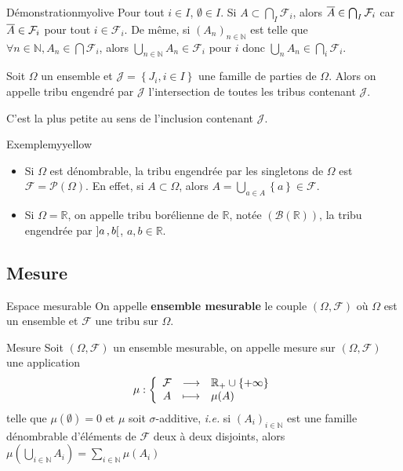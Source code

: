     \begin{demo}{Démonstration}{myolive}
        Pour tout $i \in I$, $\emptyset \in I$. Si $A \subset \bigcap_{I} \mathcal{F}_i$, alors $\overline{A} \in \bigcap_{I} \mathcal{F}_i$ car $\overline{A} \in \mathcal{F}_i$ pour tout $i \in \mathcal{F}_i$. De même, si $(A_n)_{n \in \mathbb{N}}$ est telle que $\forall n \in \mathbb{N}, A_n \in \bigcap \mathcal{F}_i$, alors $\bigcup_{n \in \mathbb{N}} A_n \in \mathcal{F}_i$ pour $i$ donc $\bigcup_n A_n \in \bigcap_i \mathcal{F}_i$.
    \end{demo}

    \begin{defi}{}{}
        Soit $\Omega$ un ensemble et $\mathcal{J} = \left\{J_i, i \in I\right\}$ une famille de parties de $\Omega$. Alors on appelle tribu engendré par $\mathcal{J}$ l’intersection de toutes les tribus contenant $\mathcal{J}$.
    \end{defi}

    C’est la plus petite au sens de l’inclusion contenant $\mathcal{J}$.

    \begin{omed}{Exemple}{myyellow}
        \begin{itemize}
            \item Si $\Omega$ est dénombrable, la tribu engendrée par les singletons de $\Omega$ est $\mathcal{F} = \mathcal{P}(\Omega)$. En effet, si $A \subset \Omega$, alors $A = \bigcup_{a \in A} \left\{a\right\} \in \mathcal{F}$.
            \item Si $\Omega = \mathbb{R}$, on appelle tribu borélienne de $\mathbb{R}$, notée $(\mathcal{B}(\mathbb{R}))$, la tribu engendrée par $\left] a \, , b \right[$, $a,b \in \mathbb{R}$. 
        \end{itemize}
    \end{omed}

    \subsection{Mesure}

    \begin{defi}{Espace mesurable}{}
        On appelle \textbf{ensemble mesurable} le couple $(\Omega, \mathcal{F})$ où $\Omega$ est un ensemble et $\mathcal{F}$ une tribu sur $\Omega$.
    \end{defi}

    \begin{defi}{Mesure}{}
        Soit $(\Omega, \mathcal{F})$ un ensemble mesurable, on appelle mesure sur $(\Omega, \mathcal{F})$ une application 
        \[ \fonction{\mu}{\mathcal{F}}{\mathbb{R}_+ \cup \left\{+\infty\right\}}{A}{\mu(A)} \]    
        telle que $\mu(\emptyset) = 0$ et $\mu$ soit $\sigma$-additive, \textit{i.e.} si $(A_i)_{i \in \mathbb{N}}$ est une famille dénombrable d’éléments de $\mathcal{F}$ deux à deux disjoints, alors $\mu\left(\bigcup_{i \in \mathbb{N}} A_i\right) = \sum_{i \in \mathbb{N}} \mu(A_i)$
    \end{defi}

